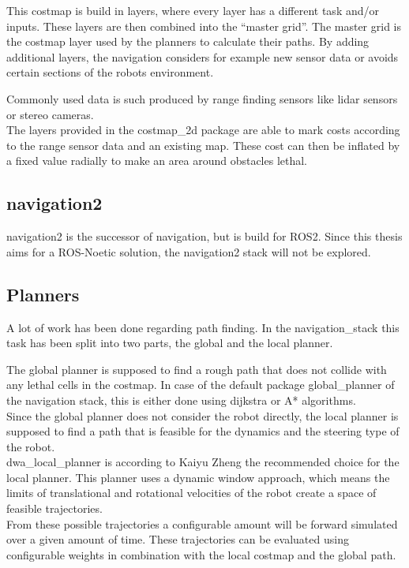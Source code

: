 This costmap is build in layers, where every layer has a different task and/or inputs. These layers are then combined into the ``master grid''. The master grid is the costmap layer used by the planners to calculate their paths\cite{costmappaper}. By adding additional layers, the navigation considers for example new sensor data or avoids certain sections of the robots environment.

Commonly used data is such produced by range finding sensors like lidar sensors or stereo cameras.\\

The layers provided in the costmap\_2d package are able to mark costs according to the range sensor data and an existing map. These cost can then be inflated by a fixed value radially\cite{costmap} to make an area around obstacles lethal.
\subsection{navigation2}

navigation2 is the successor of navigation, but is build for ROS2.
Since this thesis aims for a ROS-Noetic solution, the navigation2 stack will not be explored.

\subsection{Planners}

A lot of work has been done regarding path finding. In the navigation\_stack this task has been split into two parts, the global and the local planner.

The global planner is supposed to find a rough path that does not collide with any lethal cells in the costmap. In case of the default package global\_planner of the navigation stack, this is either done using dijkstra or A* algorithms.\\

Since the global planner does not consider the robot directly, the local planner is supposed to find a path that is feasible for the dynamics and the steering type of the robot\cite{movebase}.\\



dwa\_local\_planner is according to Kaiyu Zheng the recommended choice for the local planner\cite{navtuningguide}. This planner uses a dynamic window approach, which means the limits of translational and rotational velocities of the robot create a space of feasible trajectories.\\ 
From these possible trajectories a configurable amount will be forward simulated over a given amount of time. These trajectories can be evaluated using configurable weights in combination with the local costmap and the global path.

